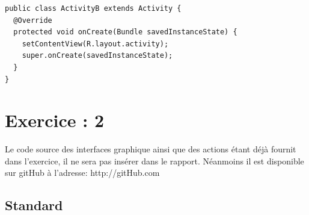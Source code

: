 \begin{lstlisting}
public class ActivityB extends Activity {
  @Override
  protected void onCreate(Bundle savedInstanceState) {
    setContentView(R.layout.activity);
    super.onCreate(savedInstanceState);
  }
}
\end{lstlisting}



	\section{Exercice : 2}
	Le code source des interfaces graphique ainsi que des actions étant déjà fournit dans l'exercice, il ne sera pas insérer dans le rapport. Néanmoins il est disponible sur gitHub à l'adresse: http://gitHub.com
	\subsection{Standard}
